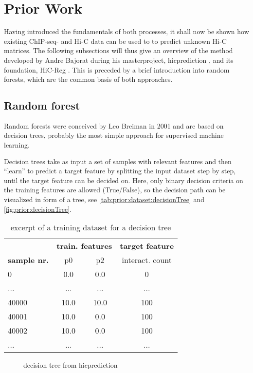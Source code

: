 \section{Prior Work}
Having introduced the fundamentals of both processes,
it shall now be shown how existing ChIP-seq- and Hi-C data 
can be used to to predict unknown Hi-C matrices.
The following subsections will thus give an overview of the
method developed by Andre Bajorat during his masterproject, hicprediction \cite{Bajorat2019},
and its foundation, HiC-Reg \cite{Zhang2019, Zhang2018}.
This is preceded by a brief introduction into random forests,
which are the common basis of both approaches.

\subsection{Random forest} \label{sec:prior:randomForests}
Random forests were conceived by Leo Breiman in 2001 \cite{Breiman2001} and are based on decision trees,
probably the most simple approach for supervised machine learning.

Decision trees take as input a set of samples with relevant features and then
``learn'' to predict a target feature by splitting the input dataset step by step, 
until the target feature can be decided on.
Here, only binary decision criteria on the training features are allowed (True/False), so the decision path can be
visualized in form of a tree, see \autoref{tab:prior:dataset:decisionTree} and \autoref{fig:prior:decisionTree}.
\begin{table}[hb]
\centering
\begin{tabular}{lccc} \hline
	   & \multicolumn{2}{c}{\textbf{train. features}} & \textbf{target feature}\\
 \textbf{sample nr.} & p0  	& p2 	& interact. count\\
 \hline
 0	& 0.0	& 0.0	& 0\\
 ...	& ...	& ...	& ...\\
 40000 	& 10.0  & 10.0	& 100\\
 40001 	& 10.0  & 0.0 	& 100\\
 40002  & 10.0  & 0.0 	& 100\\
 ...	& ...	& ...	& ...\\
 \hline
\end{tabular}
\caption{excerpt of a training dataset for a decision tree} \label{tab:prior:dataset:decisionTree}
\end{table}
\begin{figure}[hb]
 \centering
 \caption{decision tree from hicprediction}
 \label{fig:prior:decisionTree}
\end{figure}

